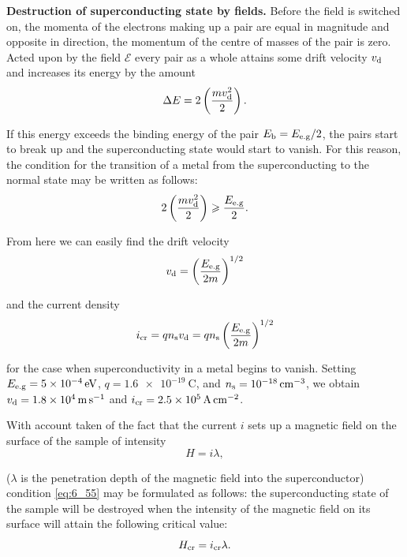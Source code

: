 \textbf{Destruction of superconducting state by fields.} Before the field is switched on, the momenta of the electrons making up a pair are equal in magnitude and opposite in direction, the momentum of the centre of masses of the pair is zero. Acted upon by the field $\mathcal{E}$ every pair as a whole attains some drift velocity $v_{\text{d}}$ and increases its energy by the amount
\begin{equation*}
	\Delta{E} = 2 \left(\frac{mv_{\text{d}}^2}{2}\right).
\end{equation*}

If this energy exceeds the binding energy of the pair $E_{\text{b}}=E_{\text{e.g}}/2$, the pairs start to break up and the superconducting state would start to vanish. For this reason, the condition for the transition of a metal from the superconducting to the normal state may be written as follows:
\begin{equation*}
	2 \left(\frac{mv_{\text{d}}^2}{2}\right) \geqslant \frac{E_{\text{e.g}}}{2}.
\end{equation*}

\noindent
From here we can easily find the drift velocity
\begin{equation*}
	v_{\text{d}} = \left(\frac{E_{\text{e.g}}}{2m}\right)^{1/2}
\end{equation*}

\noindent
and the current density
\begin{equation}\label{eq:6_55}
	i_{\text{cr}} = q n_{\text{s}} v_{\text{d}} = q n_{\text{s}} \left(\frac{E_{\text{e.g}}}{2m}\right)^{1/2}
\end{equation}

\noindent
for the case when superconductivity in a metal begins to vanish. Setting $E_{\text{e.g}}=\SI{5e-4}{\electronvolt}$, $q=\SI{1.6e-19}{\coulomb}$, and $n_{\text{s}}=\SI{e-18}{\per\centi\metre\cubed}$, we obtain $v_{\text{d}}=\SI{1.8e4}{\metre\per\second}$ and $i_{\text{cr}}=\SI{2.5e5}{\ampere\per\centi\metre\squared}$.

With account taken of the fact that the current $i$ sets up a magnetic field on the surface of the sample of intensity
\begin{equation}\label{eq:6_56}
	H = i \lambda,
\end{equation}

\noindent
($\lambda$ is the penetration depth of the magnetic field into the superconductor) condition \eqref{eq:6_55} may be formulated as follows: the superconducting state of the sample will be destroyed when the intensity of the magnetic field on its surface will attain the following critical value:
\begin{equation}\label{eq:6_57}
	H_{\text{cr}} = i_{\text{cr}} \lambda.
\end{equation}

